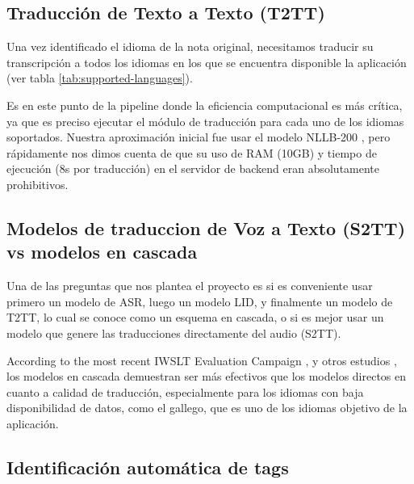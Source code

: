 \subsection{Traducción de Texto a Texto (T2TT)}
Una vez identificado el idioma de la nota original, necesitamos traducir su transcripción a todos los idiomas en los que se encuentra disponible la aplicación (ver tabla \ref{tab:supported-languages}). 

Es en este punto de la pipeline donde la eficiencia computacional es más crítica, ya que es preciso ejecutar el módulo de traducción para cada uno de los idiomas soportados. Nuestra aproximación inicial fue usar el modelo NLLB-200 \cite{ott2020nllb}, pero rápidamente nos dimos cuenta de que su uso de RAM (10GB) y tiempo de ejecución (8s por traducción) en el servidor de backend eran absolutamente prohibitivos.



\subsection{Modelos de traduccion de Voz a Texto (S2TT) vs modelos en cascada}
Una de las preguntas que nos plantea el proyecto es si es conveniente usar primero un modelo de ASR, luego un modelo LID, y finalmente un modelo de T2TT, lo cual se conoce como un esquema en cascada, o si es mejor usar un modelo que genere las traducciones directamente del audio (S2TT).

According to the most recent IWSLT Evaluation Campaign \cite{iwslt-findings}, y otros estudios \cite{etchegoyhen2022cascade} \cite{Sethiya2025}, los modelos en cascada demuestran ser más efectivos que los modelos directos en cuanto a calidad de traducción, especialmente para los idiomas con baja disponibilidad de datos, como el gallego, que es uno de los idiomas objetivo de la aplicación.

\subsection{Identificación automática de tags}

